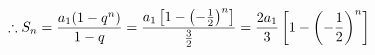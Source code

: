 \documentclass[preview]{standalone}
\begin{document}
\begin{align*}
\special{dvisvgm:raw <g id='unique000'>}\therefore S_n=\frac{a_1(1-q^n)}{1-q}=\frac{a_1\left[1-\left(-\frac{1}{2}\right)^n\right]}{\frac{3}{2}}=\frac{2a_1}{3}\left[1-\left(-\frac{1}{2}\right)^n\right]\special{dvisvgm:raw </g>}
\end{align*}
\end{document}
